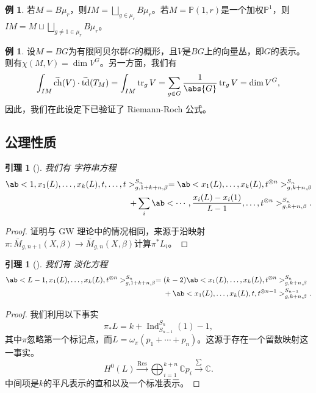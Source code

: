 \documentclass{amsart}
\newtheorem{lem}[thm]{引理}
\theoremstyle{definition}
\newtheorem{exm}[thm]{例}
\theoremstyle{remark}
\theoremstyle{plain}
\theoremstyle{definition}
\theoremstyle{remark}
\newcommand{\C}{\mathbb{C}}
\renewcommand{\P}{\mathbb{P}}
\newcommand{\on}[1]{\operatorname{#1}}
\newcommand{\wt}[1]{\widetilde{#1}}
\newcommand{\1}{\mathbf{1}}
\newcommand{\2}{\mathbf{2}}
\newcommand{\3}{\mathbf{3}}
\begin{document}
\begin{exm}
若\(M = B\mu_r\)，则\(IM = \bigsqcup_{g \in \mu_r} B \mu_r\)。若\(M = \P(1, r)\)是一个加权\(\P^1\)，则\(IM = M \sqcup \bigsqcup_{g \neq 1 \in \mu_r} B\mu_r\)。
\end{exm}

\begin{exm}
设\(M = BG\)为有限阿贝尔群\(G\)的概形，且\(V\)是\(BG\)上的向量丛，即\(G\)的表示。则有\(\chi(M, V) = \dim V^G\)。另一方面，我们有
    \[ \int_{IM} \wt{\on{ch}}(V) \cdot \wt{\on{td}}(T_M) = \int_{IM} \on{tr}_g V = \sum_{g \in G} \frac{1}{\abs{G}} \on{tr}_g V = \dim V^G, \]
因此，我们在此设定下已验证了 Riemann-Roch 公式。
\end{exm}

\subsection{公理性质}%
\label{sub:Axiomatic properties}

\begin{lem}[{\cite{GiventalK7}}]
我们有 \textit{ 字符串方程}
    \begin{align*}
        \ab< 1, x_1(L), \ldots, x_k(L), t, \ldots, t >_{g, 1+k+n, \beta}^{S_n} = \ab<x_1(L), \ldots, x_k(L), t^{\otimes n}>^{S_n}_{g,k+n,\beta} \\
        + \sum_i \ab< \cdots, \frac{x_i(L) - x_i(1)}{L-1}, \ldots, t^{\otimes n}>^{S_n}_{g,k+n,\beta}. 
    \end{align*}
\end{lem}

\begin{proof}
证明与 GW 理论中的情况相同，来源于沿映射\(\pi \colon\bar{M}_{g,n+1}(X,\beta) \to \bar{M}_{g,n}(X,\beta)\)计算\(\pi^* L_i\)。
\end{proof}

\begin{lem}[{\cite{GiventalK7}}]
我们有 \textit{ 淡化方程}
    \begin{align*}
        \ab<L-1, x_1(L), \ldots, x_k(L), t^{\otimes n}>_{g,1+k+n,\beta}^{S_n} ={}& (k-2)\ab<x_1(L), \ldots, x_k(L), t^{\otimes n}>_{g,k+n,\beta}^{S_n} \\
        &+ \ab<x_1(L), \ldots, x_k(L), t, t^{\otimes n-1}>_{g,k+n,\beta}^{S_{n-1}}.
    \end{align*}
\end{lem}

\begin{proof}
我们利用以下事实
    \[ \pi_* L = k + \on{Ind}_{S_{n-1}}^{S_n}(1) - 1, \]
其中\(\pi\)忽略第一个标记点，而\(L = \omega_{\pi} (p_1 + \cdots + p_n)\)。这源于存在一个留数映射这一事实。
    \[ H^0(L) \xrightarrow{\on{Res}} \bigoplus_{i=1}^{k+n} \C p_i \xrightarrow{\sum} \C. \]
中间项是\(k\)的平凡表示的直和以及一个标准表示。
\end{proof}
\end{document}
